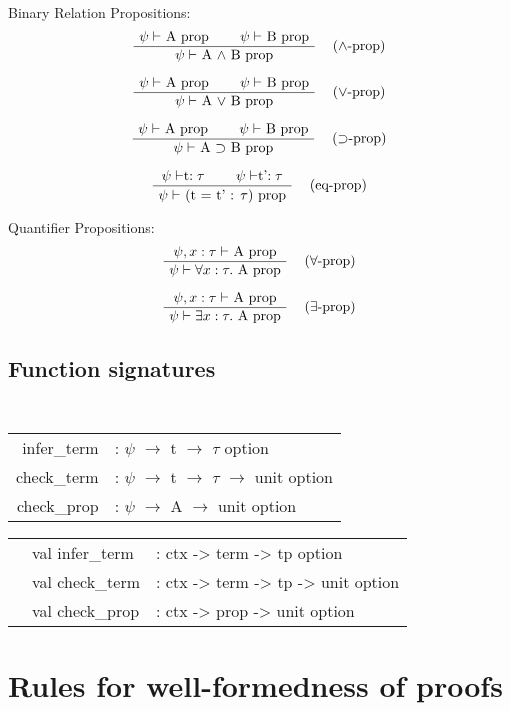 \documentclass[twoside,a4paper]{article}
\begin{document}
Binary Relation Propositions:
\[
\AxiomC{$\psi \vdash$ A prop}
\AxiomC{$\psi \vdash$ B prop}
\RightLabel{\quad ($\wedge$-prop)}
\BinaryInfC{$\psi \vdash$ A $\wedge$ B prop}
\DisplayProof
\]

\[
\AxiomC{$\psi \vdash$ A prop}
\AxiomC{$\psi \vdash$ B prop}
\RightLabel{\quad ($\vee$-prop)}
\BinaryInfC{$\psi \vdash$ A $\vee$ B prop}
\DisplayProof
\]

\[
\AxiomC{$\psi \vdash$ A prop}
\AxiomC{$\psi \vdash$ B prop}
\RightLabel{\quad ($\supset$-prop)}
\BinaryInfC{$\psi \vdash$ A $\supset$ B prop}
\DisplayProof
\]

\[
\AxiomC{$\psi \vdash $t$ : \tau$}
\AxiomC{$\psi \vdash $t'$ : \tau$}
\RightLabel{\quad (eq-prop)}
\BinaryInfC{$\psi \vdash$ (t = t' : $\tau$) prop}
\DisplayProof
\]

Quantifier Propositions:
\[
\AxiomC{$\psi , x : \tau \vdash$ A prop}
\RightLabel{\quad ($\forall$-prop)}
\UnaryInfC{$\psi \vdash \forall x : \tau .$ A prop}
\DisplayProof
\]

\[
\AxiomC{$\psi , x : \tau \vdash$ A prop}
\RightLabel{\quad ($\exists$-prop)}
\UnaryInfC{$\psi \vdash \exists x : \tau .$ A prop}
\DisplayProof
\]

\subsection{Function signatures}
\begin{center}
\tt
\begin{tabular} {rl}
infer_term &: $\psi$ $\rightarrow$ t $\rightarrow$ $\tau$ option
\\
check_term &: $\psi$ $\rightarrow$ t $\rightarrow$ $\tau$ $\rightarrow$ unit option
\\
check_prop &: $\psi$ $\rightarrow$ A $\rightarrow$ unit option
\end{tabular}

\begin{tabular} {rll}

&val infer_term &: ctx -> term -> tp option
\\
&val check_term &: ctx -> term -> tp -> unit option
\\
&val check_prop &: ctx -> prop -> unit option

\end{tabular}
\end{center}


\section{Rules for well-formedness of proofs}
\end{document}
